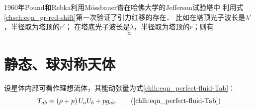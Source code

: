 1960年Pound和Rebka利用M\"ossbauer谱在哈佛大学的Jefferson试验塔中
利用式\eqref{chsch:eqn_gr-red-shift}第一次验证了引力红移的存在．
比如在塔顶光子波长是$\lambda'$，半径取为塔顶的$r'$；
在塔底光子波长是$\lambda$，半径取为塔顶的$r$；则有
\begin{equation}
a    
\end{equation}





\section{静态、球对称天体}

设星体内部可看作理想流体，其能动张量为式\eqref{chlh:eqn_perfect-fluid-Tab}：
\begin{equation}
    T_{ab}=\left(\rho  + p \right) U_a U_b +p g_{ab} . \tag{\ref{chlh:eqn_perfect-fluid-Tab}}
\end{equation}

